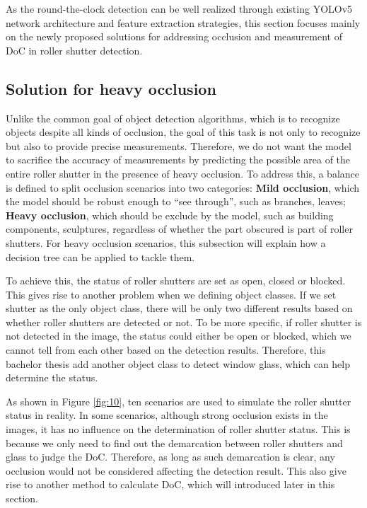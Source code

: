As the round-the-clock detection can be well realized through existing YOLOv5 network architecture and feature extraction strategies, this section focuses mainly on the newly proposed solutions for addressing occlusion and measurement of DoC in roller shutter detection.

\subsection{Solution for heavy occlusion}

Unlike the common goal of object detection algorithms, which is to recognize objects despite all kinds of occlusion, the goal of this task is not only to recognize but also to provide precise measurements. Therefore, we do not want the model to sacrifice the accuracy of measurements by predicting the possible area of the entire roller shutter in the presence of heavy occlusion. To address this, a balance is defined to split occlusion scenarios into two categories: \textbf{Mild occlusion}, which the model should be robust enough to “see through”, such as branches, leaves; \textbf{Heavy occlusion}, which should be exclude by the model, such as building components, sculptures, regardless of whether the part obscured is part of roller shutters. For heavy occlusion scenarios, this subsection will explain how a decision tree can be applied to tackle them.

To achieve this, the status of roller shutters are set as open, closed or blocked. This gives rise to another problem when we defining object classes. If we set shutter as the only object class, there will be only two different results based on whether roller shutters are detected or not. To be more specific, if roller shutter is not detected in the image, the status could either be open or blocked, which we cannot tell from each other based on the detection results. Therefore, this bachelor thesis add another object class to detect window glass, which can help determine the status.

As shown in Figure \ref{fig:10}, ten scenarios are used to simulate the roller shutter status in reality. In some scenarios, although strong occlusion exists in the images, it has no influence on the determination of roller shutter status. This is because we only need to find out the demarcation between roller shutters and glass to judge the DoC. Therefore, as long as such demarcation is clear, any occlusion would not be considered affecting the detection result. This also give rise to another method to calculate DoC, which will introduced later in this section.

